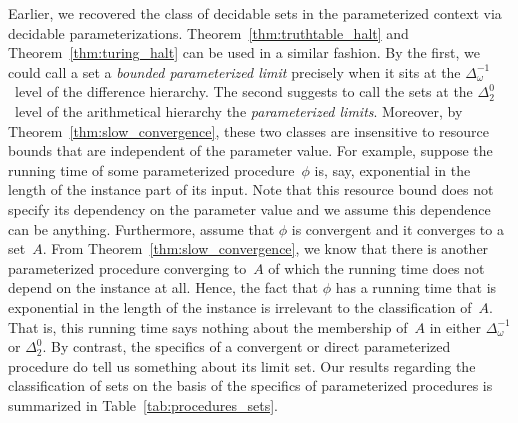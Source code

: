 Earlier, we recovered the class of decidable sets in the parameterized context via decidable parameterizations.
Theorem~\ref{thm:truthtable_halt} and Theorem~\ref{thm:turing_halt} can be used in a similar fashion.
By the first, we could call a set a \emph{bounded parameterized limit} precisely when it sits at the $\Delta^{-1}_\omega$~level of the difference hierarchy.
The second suggests to call the sets at the $\Delta^0_2$~level of the arithmetical hierarchy the \emph{parameterized limits}.
Moreover, by Theorem~\ref{thm:slow_convergence}, these two classes are insensitive to resource bounds that are independent of the parameter value.
For example, suppose the running time of some parameterized procedure~$\phi$ is, say, exponential in the length of the instance part of its input.
Note that this resource bound does not specify its dependency on the parameter value and we assume this dependence can be anything.
Furthermore, assume that $\phi$ is convergent and it converges to a set~$A$.
From Theorem~\ref{thm:slow_convergence}, we know that there is another parameterized procedure converging to~$A$ of which the running time does not depend on the instance at all.
Hence, the fact that $\phi$ has a running time that is exponential in the length of the instance is irrelevant to the classification of~$A$.
That is, this running time says nothing about the membership of~$A$ in either $\Delta^{-1}_\omega$ or $\Delta^0_2$.
By contrast, the specifics of a convergent or direct parameterized procedure do tell us something about its limit set.
Our results regarding the classification of sets on the basis of the specifics of parameterized procedures is summarized in Table~\ref{tab:procedures_sets}.

